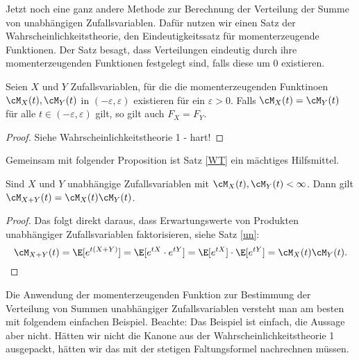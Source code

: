 Jetzt noch eine ganz andere Methode zur Berechnung der Verteilung der Summe von unabh\"angigen Zufallsvariablen. Daf\"ur nutzen wir einen Satz der Wahrscheinlichkeitstheorie, den Eindeutigkeitssatz f\"ur momenterzeugende Funktionen. Der Satz besagt, dass Verteilungen eindeutig durch ihre momenterzeugenden Funktionen festgelegt sind, falls diese um $0$ existieren.
\begin{satz}\label{WT}
	Seien $X$ und $Y$ Zufallsvariablen, f\"ur die die momenterzeugenden Funktinoen $\cM_X(t),\cM_Y(t)$ in $(-\varepsilon,\varepsilon)$ existieren für ein $\varepsilon > 0$. Falls $\cM_X(t) = \cM_Y(t)$ für alle $t \in (-\varepsilon,\varepsilon)$ gilt, so gilt auch $F_X = F_Y$.
\end{satz}
\begin{proof}
	Siehe Wahrscheinlichkeitstheorie 1 - hart!
\end{proof}
Gemeinsam mit folgender Proposition ist Satz \ref{WT} ein m\"achtiges Hilfsmittel.
\begin{prop}\label{P7}
	Sind $X$ und $Y$ unabhängige Zufallsvariablen mit $\cM_X(t),\cM_Y(t) < \infty$. Dann gilt $\cM_{X+Y}(t) = \cM_X(t)\cM_Y(t)$.
\end{prop}

\begin{proof} 
Das folgt direkt daraus, dass Erwartungswerte von Produkten unabh\"angiger Zufallsvariablen faktorisieren, siehe Satz \ref{un}:
	$$\cM_{X+Y}(t) = \E[e^{t(X+Y)}] = \E[e^{tX}\cdot e^{tY}] = \E[e^{tX}] \cdot \E[e^{tY}] = \cM_X(t)\cM_Y(t).$$
\end{proof}

Die Anwendung der momenterzeugenden Funktion zur Bestimmung der Verteilung von Summen unabh\"angiger Zufallsvariablen versteht man am besten mit folgendem einfachen Beispiel. Beachte: Das Beispiel ist einfach, die Aussage aber nicht. H\"atten wir nicht die Kanone aus der Wahrscheinlichkeitstheorie 1 ausgepackt, h\"atten wir das mit der stetigen Faltungsformel nachrechnen m\"ussen. 

